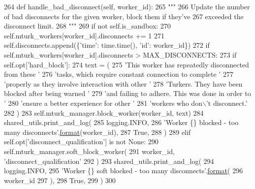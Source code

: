 \begin{DoxyCode}
264     \textcolor{keyword}{def }handle\_bad\_disconnect(self, worker\_id):
265         \textcolor{stringliteral}{"""}
266 \textcolor{stringliteral}{        Update the number of bad disconnects for the given worker, block them if they've}
267 \textcolor{stringliteral}{        exceeded the disconnect limit.}
268 \textcolor{stringliteral}{        """}
269         \textcolor{keywordflow}{if} \textcolor{keywordflow}{not} self.is\_sandbox:
270             self.mturk\_workers[worker\_id].disconnects += 1
271             self.disconnects.append(\{\textcolor{stringliteral}{'time'}: time.time(), \textcolor{stringliteral}{'id'}: worker\_id\})
272             \textcolor{keywordflow}{if} self.mturk\_workers[worker\_id].disconnects > MAX\_DISCONNECTS:
273                 \textcolor{keywordflow}{if} self.opt[\textcolor{stringliteral}{'hard\_block'}]:
274                     text = (
275                         \textcolor{stringliteral}{'This worker has repeatedly disconnected from these '}
276                         \textcolor{stringliteral}{'tasks, which require constant connection to complete '}
277                         \textcolor{stringliteral}{'properly as they involve interaction with other '}
278                         \textcolor{stringliteral}{'Turkers. They have been blocked after being warned '}
279                         \textcolor{stringliteral}{'and failing to adhere. This was done in order to '}
280                         \textcolor{stringliteral}{'ensure a better experience for other '}
281                         \textcolor{stringliteral}{'workers who don\(\backslash\)'t disconnect.'}
282                     )
283                     self.mturk\_manager.block\_worker(worker\_id, text)
284                     shared\_utils.print\_and\_log(
285                         logging.INFO,
286                         \textcolor{stringliteral}{'Worker \{\} blocked - too many disconnects'}.\hyperlink{namespaceparlai_1_1chat__service_1_1services_1_1messenger_1_1shared__utils_a32e2e2022b824fbaf80c747160b52a76}{format}(worker\_id),
287                         \textcolor{keyword}{True},
288                     )
289                 \textcolor{keywordflow}{elif} self.opt[\textcolor{stringliteral}{'disconnect\_qualification'}] \textcolor{keywordflow}{is} \textcolor{keywordflow}{not} \textcolor{keywordtype}{None}:
290                     self.mturk\_manager.soft\_block\_worker(
291                         worker\_id, \textcolor{stringliteral}{'disconnect\_qualification'}
292                     )
293                     shared\_utils.print\_and\_log(
294                         logging.INFO,
295                         \textcolor{stringliteral}{'Worker \{\} soft blocked - too many disconnects'}.\hyperlink{namespaceparlai_1_1chat__service_1_1services_1_1messenger_1_1shared__utils_a32e2e2022b824fbaf80c747160b52a76}{format}(
296                             worker\_id
297                         ),
298                         \textcolor{keyword}{True},
299                     )
300 
\end{DoxyCode}
